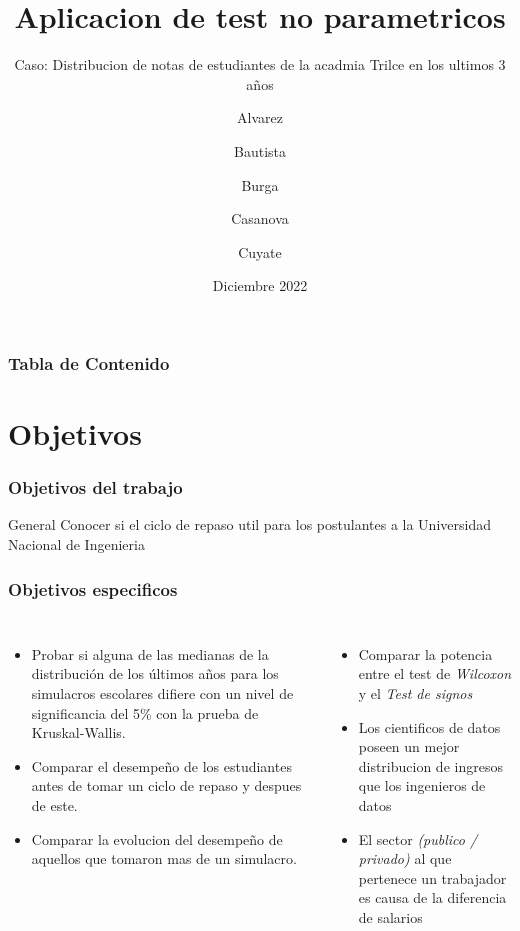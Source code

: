 \documentclass{beamer}
\title[PC3 Estadistica Aplicada] %
{Aplicacion de test no parametricos}
\subtitle{
  Caso: Distribucion de notas de estudiantes de la acadmia
    Trilce en los ultimos 3 años
}
\author %
{
  Alvarez \and Bautista \and Burga \and
  Casanova \and  Cuyate
}
\institute
{
  Facultad de Ingenieria Industrial y de Sistemas\\
  \textbf{Universidad Nacional de Ingenieria}
}
\date
{Diciembre 2022}
\begin{document}
\frame{\titlepage}


\begin{frame}
\frametitle{Tabla de Contenido}
\tableofcontents
\end{frame}
\section{Objetivos}

\begin{frame}

\frametitle{Objetivos del trabajo}

\begin{alertblock}{General}
  Conocer si el ciclo de repaso util para los postulantes a la
  Universidad Nacional de Ingenieria
\end{alertblock}
\end{frame}

\begin{frame}
\frametitle{Objetivos especificos}

\begin{columns}

  \begin{itemize}
      \item Probar si alguna de las medianas de la distribución de los últimos años para
      los simulacros escolares difiere con un nivel de significancia del 5\% con la prueba de Kruskal-Wallis.
      \item Comparar el desempeño de los estudiantes antes de tomar un ciclo
        de repaso y despues de este.
      \item Comparar la evolucion del desempeño de aquellos que tomaron mas de un simulacro.

  \end{itemize}


  \begin{itemize}
      \item Comparar la potencia entre el test de \textit{Wilcoxon} y
      el \textit{Test de signos}
      \item Los cientificos de datos poseen un mejor distribucion de ingresos
        que los ingenieros de datos
      \item El sector \textit{(publico / privado)} al que pertenece un trabajador
        es causa de la diferencia de salarios
  \end{itemize}
\end{columns}
\end{frame}
\end{document}
